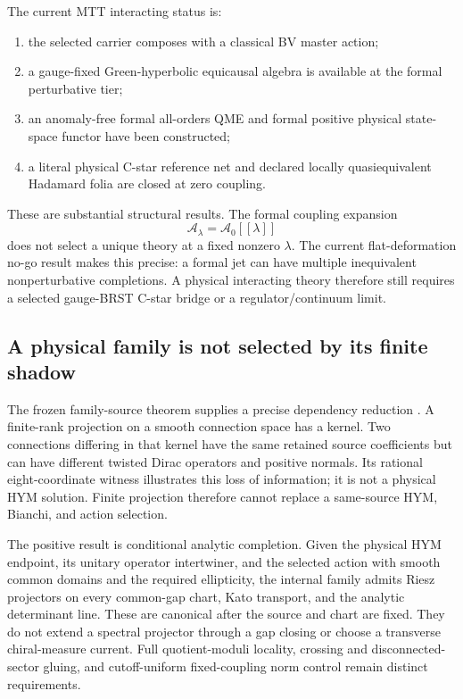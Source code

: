\documentclass[11pt]{article}
\theoremstyle{definition}
\theoremstyle{remark}
\newcommand{\A}{\mathcal A}
\begin{document}
The current MTT interacting status is:
\begin{enumerate}
\item the selected carrier composes with a classical BV master action;
\item a gauge-fixed Green-hyperbolic equicausal algebra is available at the
formal perturbative tier;
\item an anomaly-free formal all-orders QME and formal positive physical
state-space functor have been constructed;
\item a literal physical C-star reference net and declared locally
quasiequivalent Hadamard folia are closed at zero coupling.
\end{enumerate}

These are substantial structural results. The formal coupling expansion
\[
 \A_\lambda=\A_0[[\lambda]]
\]
does not select a unique theory at a fixed nonzero \(\lambda\). The current
flat-deformation no-go result makes this precise: a formal jet can have
multiple inequivalent nonperturbative completions. A physical interacting
theory therefore still requires a selected gauge-BRST C-star bridge or a
regulator/continuum limit.

\subsection{A physical family is not selected by its finite shadow}
\label{sec:physical-family}

The frozen family-source theorem supplies a precise dependency reduction
\cite{FrozenFamily}. A finite-rank projection on a smooth connection space
has a kernel. Two connections differing in that kernel have the same retained
source coefficients but can have different twisted Dirac operators and
positive normals. Its rational eight-coordinate witness illustrates this
loss of information; it is not a physical HYM solution. Finite projection
therefore cannot replace a same-source HYM, Bianchi, and action selection.

The positive result is conditional analytic completion. Given the physical
HYM endpoint, its unitary operator intertwiner, and the selected action with
smooth common domains and the required ellipticity, the internal family
admits Riesz projectors on every common-gap chart, Kato transport, and the
analytic determinant line. These are canonical after the source and chart
are fixed. They do not extend a spectral projector through a gap closing or
choose a transverse chiral-measure current. Full quotient-moduli locality,
crossing and disconnected-sector gluing, and cutoff-uniform fixed-coupling
norm control remain distinct requirements.
\end{document}
